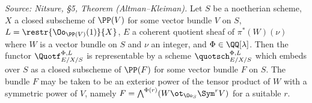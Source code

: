 \begin{theorem}
  \label{thm:altman-kleiman-quot}
  \textit{Source: Nitsure, §5, Theorem (Altman--Kleiman).}
  Let $S$ be a noetherian scheme, $X$ a closed subscheme of $\PP(V)$ for some
  vector bundle $V$ on $S$, $L = \restr{\Oo_{\PP(V)}(1)}{X}$, $E$ a coherent
  quotient sheaf of $\pi^*(W)(\nu)$ where $W$ is a vector bundle on $S$ and
  $\nu$ an integer, and $\Phi \in \QQ[\lambda]$. Then the functor
  $\Quotf_{E/X/S}^{\Phi,L}$ is representable by a scheme
  $\quotsch_{E/X/S}^{\Phi,L}$ which embeds over $S$ as a closed subscheme of
  $\PP(F)$ for some vector bundle $F$ on $S$. The bundle $F$ may be taken to be
  an exterior power of the tensor product of $W$ with a symmetric power of $V$,
  namely $F = \bigwedge^{\Phi(r)}(W \ot_{\Oo_S} \Sym^r V)$ for a suitable $r$.
\end{theorem}

